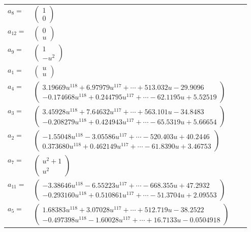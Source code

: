 \documentclass[1p]{elsarticle_modified}
\theoremstyle{definition}
\begin{document}
\begin{tabular}{m{7pt} m{180pt} m{7pt} m{180pt} }
\flushright $a_{8}=$&$\begin{pmatrix}1\\0\end{pmatrix}$ \\
\flushright $a_{12}=$&$\begin{pmatrix}0\\u\end{pmatrix}$ \\
\flushright $a_{9}=$&$\begin{pmatrix}1\\- u^2\end{pmatrix}$ \\
\flushright $a_{1}=$&$\begin{pmatrix}u\\u\end{pmatrix}$ \\
\flushright $a_{4}=$&$\begin{pmatrix}3.19669 u^{118}+6.97979 u^{117}+\cdots+513.032 u-29.9096\\-0.174668 u^{118}+0.244795 u^{117}+\cdots-62.1195 u+5.52519\end{pmatrix}$ \\
\flushright $a_{3}=$&$\begin{pmatrix}3.45928 u^{118}+7.64632 u^{117}+\cdots+563.101 u-34.8483\\-0.208279 u^{118}+0.424943 u^{117}+\cdots-65.5319 u+5.66654\end{pmatrix}$ \\
\flushright $a_{2}=$&$\begin{pmatrix}-1.55048 u^{118}-3.05586 u^{117}+\cdots-520.403 u+40.2446\\0.373680 u^{118}+0.462149 u^{117}+\cdots-61.8390 u+3.46753\end{pmatrix}$ \\
\flushright $a_{7}=$&$\begin{pmatrix}u^2+1\\u^2\end{pmatrix}$ \\
\flushright $a_{11}=$&$\begin{pmatrix}-3.38646 u^{118}-6.55223 u^{117}+\cdots-668.355 u+47.2932\\-0.293160 u^{118}+0.510861 u^{117}+\cdots-51.3704 u+2.09553\end{pmatrix}$ \\
\flushright $a_{5}=$&$\begin{pmatrix}1.68383 u^{118}+3.07028 u^{117}+\cdots+512.719 u-38.2522\\-0.497398 u^{118}-1.60028 u^{117}+\cdots+16.7133 u-0.0504918\end{pmatrix}$ \\

\end{tabular}
\end{document}

